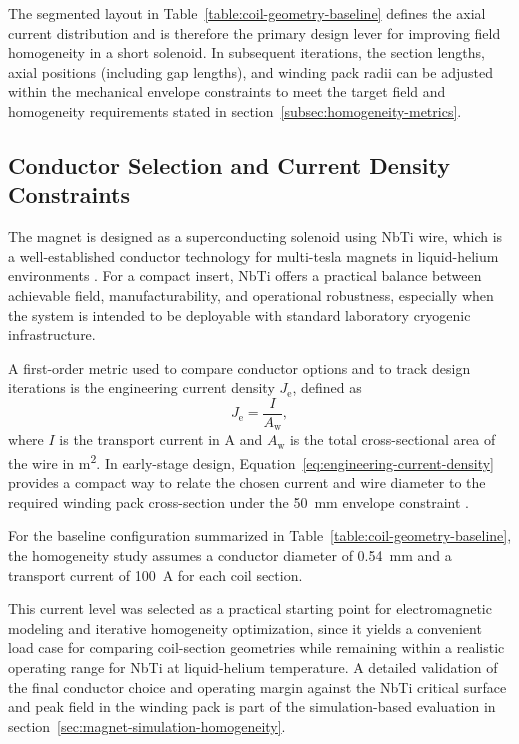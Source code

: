 \documentclass[FM,DP,EN,twoside]{tulthesis}
\begin{document}
The segmented layout in Table~\ref{table:coil-geometry-baseline} defines the axial current distribution and is therefore the primary design lever for improving field homogeneity in a short solenoid. In subsequent iterations, the section lengths, axial positions (including gap lengths), and winding pack radii can be adjusted within the mechanical envelope constraints to meet the target field and homogeneity requirements stated in section~\ref{subsec:homogeneity-metrics}.

\subsection{Conductor Selection and Current Density Constraints}
\label{subsec:conductor-selection}
The magnet is designed as a superconducting solenoid using NbTi wire, which is a well-established conductor technology for multi-tesla magnets in liquid-helium environments \cite{Kowalska2023MABudget}. For a compact insert, NbTi offers a practical balance between achievable field, manufacturability, and operational robustness, especially when the system is intended to be deployable with standard laboratory cryogenic infrastructure.

A first-order metric used to compare conductor options and to track design iterations is the engineering current density $J_\mathrm{e}$, defined as
\begin{equation}
J_\mathrm{e} = \frac{I}{A_\mathrm{w}},
\label{eq:engineering-current-density}
\end{equation}
where $I$ is the transport current in \si{\ampere} and $A_\mathrm{w}$ is the total cross-sectional area of the wire in \si{\meter\squared}. In early-stage design, Equation~\ref{eq:engineering-current-density} provides a compact way to relate the chosen current and wire diameter to the required winding pack cross-section under the \SI{50}{\milli\meter} envelope constraint \cite{froes_qian_mitsuo_niinomi_2019}.

For the baseline configuration summarized in Table~\ref{table:coil-geometry-baseline}, the homogeneity study assumes a conductor diameter of \SI{0.54}{\milli\meter} and a transport current of \SI{100}{\ampere} for each coil section.

This current level was selected as a practical starting point for electromagnetic modeling and iterative homogeneity optimization, since it yields a convenient load case for comparing coil-section geometries while remaining within a realistic operating range for NbTi at liquid-helium temperature. A detailed validation of the final conductor choice and operating margin against the NbTi critical surface and peak field in the winding pack is part of the simulation-based evaluation in section~\ref{sec:magnet-simulation-homogeneity}.
\end{document}
